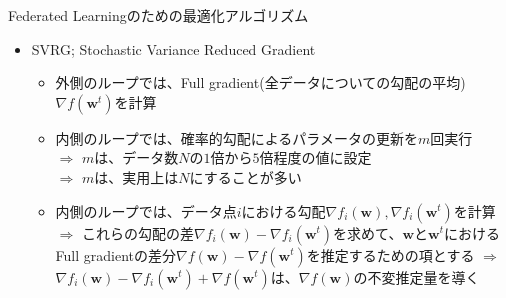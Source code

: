 \documentclass[dvipdfmx,notheorems,t]{beamer}
\begin{document}
\begin{frame}{Federated Learningのための最適化アルゴリズム}

\begin{itemize}
	\item SVRG; Stochastic Variance Reduced Gradient
	\begin{itemize}
		\item 外側のループでは、Full gradient(全データについての勾配の平均)$\nabla f(\bm{w}^t)$を計算
		\item 内側のループでは、確率的勾配によるパラメータの更新を$m$回実行 \\
		$\Rightarrow$ $m$は、データ数$N$の$1$倍から$5$倍程度の値に設定 \\
		$\Rightarrow$ $m$は、実用上は$N$にすることが多い
		\newline
		
		\item 内側のループでは、データ点$i$における勾配$\nabla f_i(\bm{w}), \nabla f_i(\bm{w}^t)$を計算 \newline \newline
		$\Rightarrow$ これらの勾配の差$\nabla f_i(\bm{w}) - \nabla f_i(\bm{w}^t)$を求めて、$\bm{w}$と$\bm{w}^t$におけるFull gradientの差分$\nabla f(\bm{w}) - \nabla f(\bm{w}^t)$を推定するための項とする \newline \newline
		$\Rightarrow$ $\nabla f_i(\bm{w}) - \nabla f_i(\bm{w}^t) + \nabla f(\bm{w}^t)$は、$\nabla f(\bm{w})$の\alert{不変推定量}を導く
	\end{itemize}
\end{itemize}

\end{frame}
\end{document}
